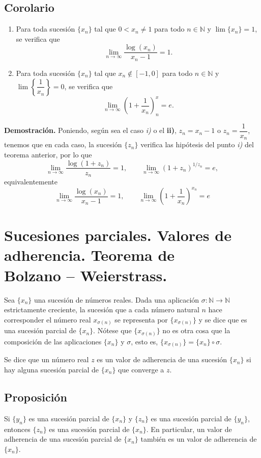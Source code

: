 \documentclass[10pt,a4paper]{article}
\begin{document}
	\subsection{Corolario}
	
	\begin{enumerate}[label=\roman*]
		\item Para toda sucesión $\{x_n\}$ tal que $ 0 < x_n \neq 1$ para todo $n \in \mathbb{N}$ y $\lim\{x_n\} = 1$, se verifica que $$\lim_{n \rightarrow \infty}\dfrac{\log(x_n)}{x_n-1} = 1.$$
		\item Para toda sucesión $\{x_n\}$ tal que $x_n \notin [-1, 0]$ para todo $n \in \mathbb{N}$ y $\lim\left\{\dfrac{1}{x_n}\right\} = 0$, se verifica que 
		$$ \lim_{n \rightarrow \infty}\left(1 + \dfrac{1}{x_n}\right) ^x_n = e.$$
	\end{enumerate}

	\textbf{Demostración. }Poniendo, según sea el caso \textit{i)} o el \textbf{ii)}, $z_n = x_n-1$ o $z_n = \dfrac{1}{x_n}$, tenemos que en cada caso, la sucesión $\{z_n\}$ verifica las hipótesis del punto \textit{i)} del teorema anterior, por lo que 
	$$\lim_{n \rightarrow \infty}\dfrac{\log(1+z_n)}{z_n} = 1, \qquad \lim_{n \rightarrow \infty}(1+z_n)^{1/z_n} = e,$$
	equivalentemente
	$$\lim_{n \rightarrow \infty}\dfrac{\log(x_n)}{x_n -1} = 1, \qquad \lim_{n \rightarrow \infty}\left(1+\dfrac{1}{x_n}\right)^{x_n} = e$$
	
	\newpage
	\section{Sucesiones parciales. Valores de adherencia. Teorema de \\ \quad \; Bolzano – Weierstrass.}
	
	Sea $\{x_n\}$ una sucesión de números reales. Dada una aplicación $\sigma : \mathbb{N} \rightarrow \mathbb{N}$ estrictamente creciente, la sucesión que a cada número natural $n$ hace corresponder el número real $x_{\sigma(n)}$ se representa por $\{x_{\sigma(n)}\}$ y se dice que es una sucesión parcial de $\{x_n\}$. Nótese que $\{x_{\sigma(n)}\}$ no es otra cosa que la composición de las aplicaciones $\{x_n\}$ y $\sigma$, esto es, $\{x_{\sigma(n)}\} = \{x_n\} \circ \sigma$.
	
	Se dice que un número real $z$ es un valor de adherencia de una sucesión $\{x_n\}$ si hay alguna sucesión parcial de $\{x_n\}$ que converge a $z$.
	
	\subsection{Proposición}
	Si $\{y_n\}$ es una sucesión parcial de $\{x_n\}$ y $\{z_n\}$ es una sucesión parcial de $\{y_n\}$, entonces $\{z_n\}$ es una sucesión parcial de $\{x_n\}$. En particular, un valor de adherencia de una sucesión parcial de $\{x_n\}$ también es un valor de adherencia de $\{x_n\}$.
	
\end{document}

